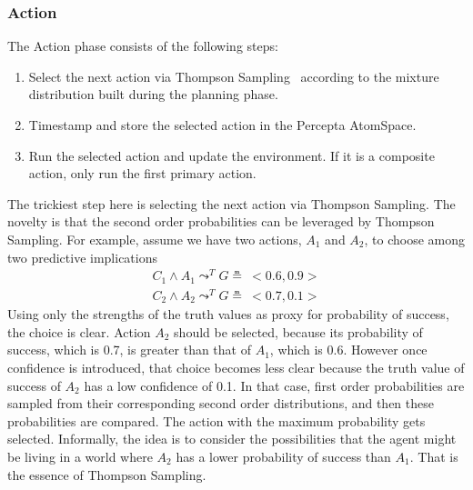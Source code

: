 \documentclass[runningheads]{llncs}
\newcommand{\lpreimp}[1]{\leadsto^{#1}}
\begin{document}
\subsubsection{Action}
The Action phase consists of the following steps:
\begin{enumerate}
\item Select the next action via Thompson Sampling~\cite{Leike2016}
  according to the mixture distribution built during the planning
  phase.
\item Timestamp and store the selected action in the Percepta
  AtomSpace.
\item Run the selected action and update the environment.  If it is a
  composite action, only run the first primary action.
\end{enumerate}
The trickiest step here is selecting the next action via Thompson
Sampling.  The novelty is that the second order probabilities can be
leveraged by Thompson Sampling.  For example, assume we have two
actions, $A_1$ and $A_2$, to choose among two predictive implications
$$
\begin{array}{c}
  C_1 \land A_1 \lpreimp{T} G \measeq\ <\!0.6, 0.9\!> \\
  C_2 \land A_2 \lpreimp{T} G \measeq\ <\!0.7, 0.1\!>
\end{array}
$$
Using only the strengths of the truth values as proxy for probability
of success, the choice is clear.  Action $A_2$ should be selected,
because its probability of success, which is 0.7, is greater than that
of $A_1$, which is 0.6.  However once confidence is introduced, that
choice becomes less clear because the truth value of success of $A_2$
has a low confidence of 0.1.  In that case, first order probabilities
are sampled from their corresponding second order distributions,
and then these probabilities are compared.  The action with the
maximum probability gets selected.  Informally, the idea is to
consider the possibilities that the agent might be living in a world
where $A_2$ has a lower probability of success than $A_1$.  That is
the essence of Thompson Sampling.
\end{document}
